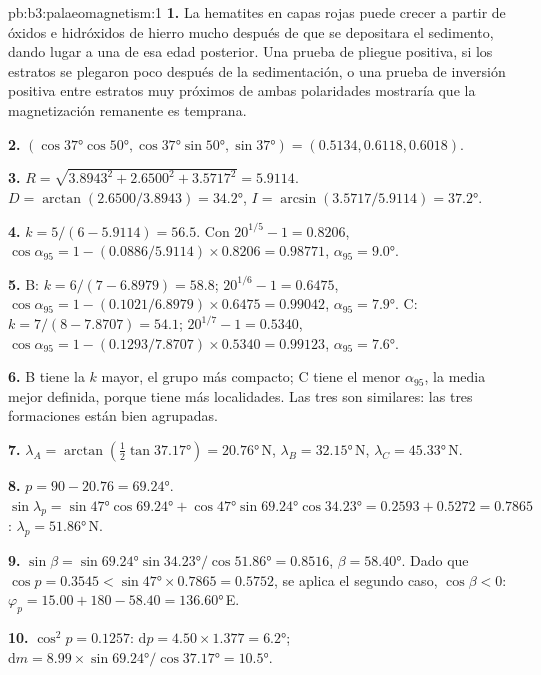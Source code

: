 \begin{solution}{pb:b3:palaeomagnetism:1}
\textbf{1.} La hematites en capas rojas puede crecer a partir de óxidos e hidróxidos de hierro
mucho después de que se depositara el sedimento, dando lugar a una  de esa
edad posterior. Una prueba de pliegue positiva, si los estratos se plegaron poco después de
la sedimentación, o una prueba de inversión positiva entre estratos muy próximos de ambas
polaridades mostraría que la magnetización remanente es temprana.

\textbf{2.} $(\cos\ang{37}\cos\ang{50}, \cos\ang{37}\sin\ang{50}, \sin\ang{37})
= (0.5134, 0.6118, 0.6018)$.

\textbf{3.} $R = \sqrt{3.8943^2 + 2.6500^2 + 3.5717^2} = 5.9114$. $D =
\arctan(2.6500/3.8943) = \ang{34.2}$, $I = \arcsin(3.5717/5.9114) = \ang{37.2}$.

\textbf{4.} $k = 5/(6 - 5.9114) = 56.5$. Con $20^{1/5} - 1 = 0.8206$,
$\cos\alpha_{95} = 1 - (0.0886/5.9114)\times0.8206 = 0.98771$, $\alpha_{95} =
\ang{9.0}$.

\textbf{5.} B: $k = 6/(7 - 6.8979) = 58.8$; $20^{1/6} - 1 = 0.6475$,
$\cos\alpha_{95} = 1 - (0.1021/6.8979)\times0.6475 = 0.99042$, $\alpha_{95} =
\ang{7.9}$. C: $k = 7/(8 - 7.8707) = 54.1$; $20^{1/7} - 1 = 0.5340$,
$\cos\alpha_{95} = 1 - (0.1293/7.8707)\times0.5340 = 0.99123$, $\alpha_{95} =
\ang{7.6}$.

\textbf{6.} B tiene la $k$ mayor, el grupo más compacto; C tiene el
menor $\alpha_{95}$, la media mejor definida, porque tiene más localidades. Las tres
son similares: las tres formaciones están bien agrupadas.

\textbf{7.} $\lambda_A = \arctan(\tfrac12\tan\ang{37.17}) = \ang{20.76}$\,N,
$\lambda_B = \ang{32.15}$\,N, $\lambda_C = \ang{45.33}$\,N.

\textbf{8.} $p = 90 - 20.76 = \ang{69.24}$. $\sin\lambda_p =
\sin\ang{47}\cos\ang{69.24} + \cos\ang{47}\sin\ang{69.24}\cos\ang{34.23} =
0.2593 + 0.5272 = 0.7865$: $\lambda_p = \ang{51.86}$\,N.

\textbf{9.} $\sin\beta = \sin\ang{69.24}\sin\ang{34.23}/\cos\ang{51.86} =
0.8516$, $\beta = \ang{58.40}$. Dado que $\cos p = 0.3545 < \sin\ang{47}\times
0.7865 = 0.5752$, se aplica el segundo caso, $\cos\beta < 0$:
$\varphi_p = 15.00 + 180 - 58.40 = \ang{136.60}$\,E.

\textbf{10.} $\cos^2p = 0.1257$: $\mathrm dp = 4.50\times1.377 = \ang{6.2}$;
$\mathrm dm = 8.99\times\sin\ang{69.24}/\cos\ang{37.17} = \ang{10.5}$.


\end{solution}
